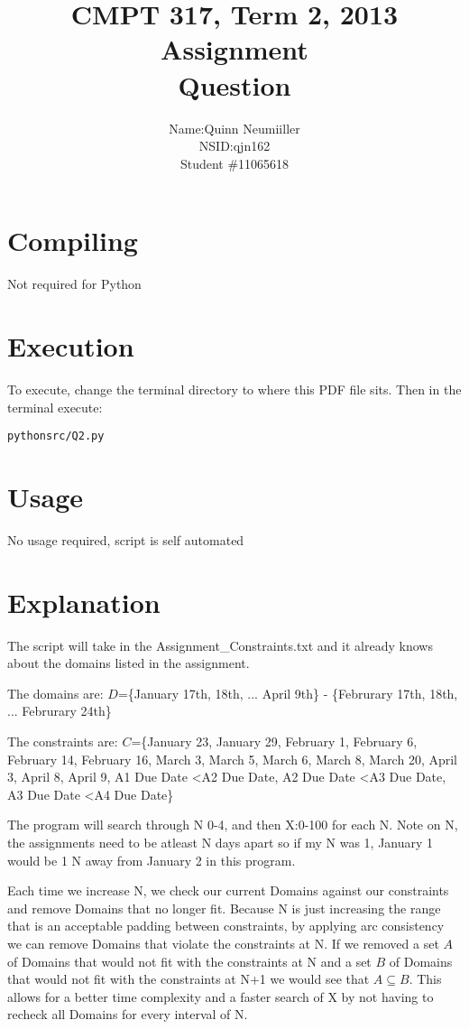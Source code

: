 \documentclass{article}
\title{CMPT 317, Term 2, 2013\\
Assignment \AssignmentNum\\
Question \QuestionNum\\
\AssignmentTitle
}
\author{
	\begin{tabular}{ l r }
	  Name: & Quinn Neumiiller \\
	  NSID: & qjn162 \\
	  Student \# & 11065618 \\
	\end{tabular}
}
\date{\AssignmentDate}
\newcommand{\QuestionNum}{2}
\begin{document}
   \maketitle
   
   \section{Compiling}
   Not required for Python

   \section{Execution}
   To execute, change the terminal directory to where this PDF file sits.
   Then in the terminal execute:
	\begin{alltt}
	python src/Q\QuestionNum.py
	\end{alltt}

  \section{Usage}
    No usage required, script is self automated
  \section{Explanation}
    The script will take in the Assignment\_Constraints.txt and it already knows about the domains listed in the assignment.

    The domains are:
    $D$=\{January 17th, 18th, ... April 9th\} - \{Februrary 17th, 18th, ... Februrary 24th\}

    The constraints are:
    $C$=\{January 23, January 29, February 1, February 6, February 14, February 16, March 3, March 5, March 6, March 8, March 20, April 3, April 8, April 9, A1 Due Date \textless A2 Due Date, A2 Due Date \textless A3 Due Date, A3 Due Date \textless A4 Due Date\}

    The program will search through N 0-4, and then X:0-100 for each N. Note on N, the assignments need to be atleast N days apart so if my N was 1, January 1 would be 1 N away from January 2 in this program.

    Each time we increase N, we check our current Domains against our constraints and remove Domains that no longer fit. Because N is just increasing the range that is an acceptable padding between constraints, by applying arc consistency we can remove Domains that violate the constraints at N. If we removed a set $A$ of Domains that would not fit with the constraints at N and a set $B$ of Domains that would not fit with the constraints at N+1 we would see that $A \subseteq B$. This allows for a better time complexity and a faster search of X by not having to recheck all Domains for every interval of N.
\end{document}
